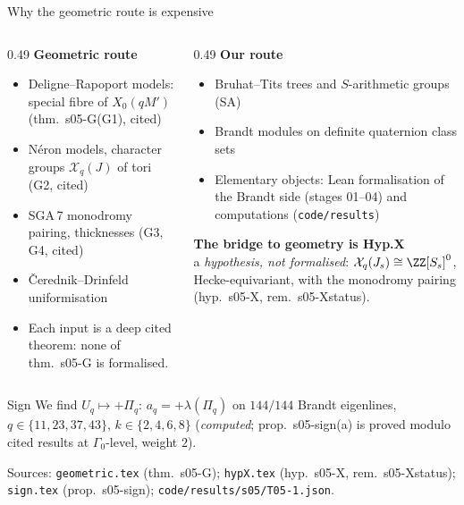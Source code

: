 \begin{frame}{Why the geometric route is expensive}
  \footnotesize
  \begin{columns}[T]
  \begin{column}{0.49\textwidth}
  {\bfseries Geometric route}
  \begin{itemize}
    \item Deligne--Rapoport models: special fibre of $X_0(qM')$ (thm.\ s05-G(G1), cited)
    \item N\'eron models, character groups $\mathcal X_q(J)$ of tori (G2, cited)
    \item SGA\,7 monodromy pairing, thicknesses (G3, G4, cited)
    \item \v Cerednik--Drinfeld uniformisation
    \item Each input is a deep cited theorem: none of thm.\ s05-G is formalised.
  \end{itemize}
  \end{column}
  \begin{column}{0.49\textwidth}
  {\bfseries Our route}
  \begin{itemize}
    \item Bruhat--Tits trees and $S$-arithmetic groups (SA)
    \item Brandt modules on definite quaternion class sets
    \item Elementary objects: Lean formalisation of the Brandt side (stages 01--04) and computations (\texttt{code/results})
  \end{itemize}
  \vspace{0.5mm}
  {\bfseries The bridge to geometry is Hyp.X}\\
  a \emph{hypothesis, not formalised}: $\mathcal X_q(J_s)\cong\ZZ[S_s]^0$, Hecke-equivariant, with the monodromy pairing (hyp.\ s05-X, rem.\ s05-Xstatus).
  \end{column}
  \end{columns}
  \vspace{0.5mm}
  \begin{block}{Sign}
    We find $U_q\mapsto{+}\Pi_q$: $a_q=+\lambda(\Pi_q)$ on $144/144$ Brandt eigenlines, $q\in\{11,23,37,43\}$, $k\in\{2,4,6,8\}$ (\emph{computed}; prop.\ s05-sign(a) is proved modulo cited results at $\Gamma_0$-level, weight $2$).
  \end{block}
  \vfill
  {\tiny Sources: \texttt{geometric.tex} (thm.\ s05-G); \texttt{hypX.tex} (hyp.\ s05-X, rem.\ s05-Xstatus); \texttt{sign.tex} (prop.\ s05-sign); \texttt{code/results/s05/T05-1.json}.}
\end{frame}
